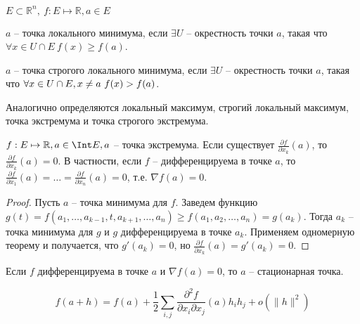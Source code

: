 \begin{definition} \thmslashn

	$E \subset \mathbb{R}^n,\ f : E \mapsto \mathbb{R}, a \in E$
	
	$a$ -- точка локального минимума, если $\exists U$ -- окрестность точки $a$, такая что $\forall x \in U \cap E\ f(x) \ge f(a)$.
	
	$a$ -- точка строгого локального минимума, если $\exists U$ -- окрестность точки $a$, такая что $\forall x \in U \cap E,\\x \neq a\ f(x) > f(a)$. 
	
	Аналогично определяются локальный максимум, строгий локальный максимум, точка экстремума и точка строгого экстремума.
\end{definition}

\begin{theorem} \thmslashn

	$f : E \mapsto \mathbb{R}, a \in \Int E, a$ -- точка экстремума. Если существует $\frac{\partial f}{\partial x_k}(a)$, то $\frac{\partial f}{\partial x_k}(a) = 0$. В частности, если $f$ -- дифференцируема в точке $a$, то $\frac{\partial f}{\partial x_1}(a) = \dots = \frac{\partial f}{\partial x_n}(a) = 0$, т.е. $\nabla f(a) = 0$.
	\begin{proof} \thmslashn
		
		Пусть $a$ -- точка минимума для $f$. Заведем функцию $g(t) = f(a_1, \dots, a_{k - 1}, t, a_{k + 1}, \dots, a_n) \ge f(a_1, a_2, \dots, a_n) = g(a_k)$. Тогда $a_k$ -- точка минимума для $g$ и $g$ дифференцируема в точке $a_k$. Применяем одномерную теорему и получается, что $g'(a_k) = 0$, но $\frac{\partial f}{\partial x_k}(a) = g'(a_k) = 0$.
	\end{proof}
\end{theorem}

\begin{definition} \thmslashn
	
	Если $f$ дифференцируема в точке $a$ и $\nabla f(a) = 0$, то $a$ -- стационарная точка.
\end{definition}

\begin{remark} \thmslashn

	\[
	f(a + h) = f(a) + \frac{1}{2}\sum_{i, j}\frac{\partial^2f}{\partial x_i \partial x_j}(a)h_ih_j + o(\|h\|^2)
	\]
\end{remark}
